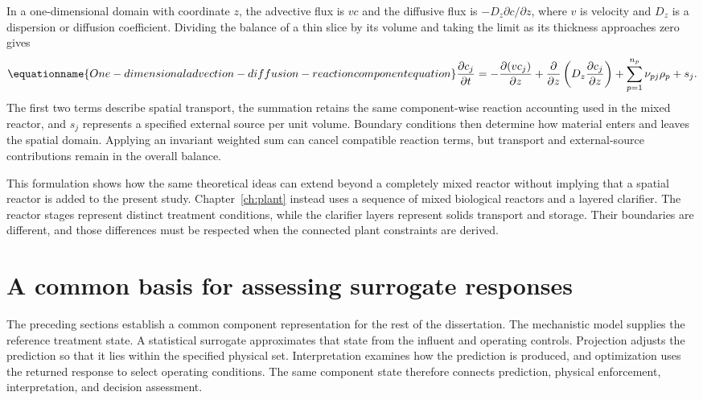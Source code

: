 In a one-dimensional domain with coordinate $z$, the advective flux is $vc$ and the diffusive flux is
$-D_z\partial c/\partial z$, where $v$ is velocity and $D_z$ is a dispersion or diffusion coefficient. Dividing the balance of a thin slice by its volume and taking the limit as its thickness approaches zero gives
\begin{equation}
\equationname{One-dimensional advection-diffusion-reaction component equation}
\frac{\partial c_j}{\partial t}
=-\frac{\partial(v c_j)}{\partial z}
+\frac{\partial}{\partial z}
\left(D_z\frac{\partial c_j}{\partial z}\right)
+\sum_{p=1}^{n_p}\nu_{pj}\rho_p+s_j.
\label{eq:teaching_spatial_balance}
\end{equation}
The first two terms describe spatial transport, the summation retains the same component-wise reaction accounting used in the mixed reactor, and $s_j$ represents a specified external source per unit volume. Boundary conditions then determine how material enters and leaves the spatial domain. Applying an invariant weighted sum can cancel compatible reaction terms, but transport and external-source contributions remain in the overall balance.

This formulation shows how the same theoretical ideas can extend beyond a completely mixed reactor without implying that a spatial reactor is added to the present study. Chapter~\ref{ch:plant} instead uses a sequence of mixed biological reactors and a layered clarifier. The reactor stages represent distinct treatment conditions, while the clarifier layers represent solids transport and storage. Their boundaries are different, and those differences must be respected when the connected plant constraints are derived.

\section{A common basis for assessing surrogate responses}

The preceding sections establish a common component representation for the rest of the dissertation. The mechanistic model supplies the reference treatment state. A statistical surrogate approximates that state from the influent and operating controls. Projection adjusts the prediction so that it lies within the specified physical set. Interpretation examines how the prediction is produced, and optimization uses the returned response to select operating conditions. The same component state therefore connects prediction, physical enforcement, interpretation, and decision assessment.

